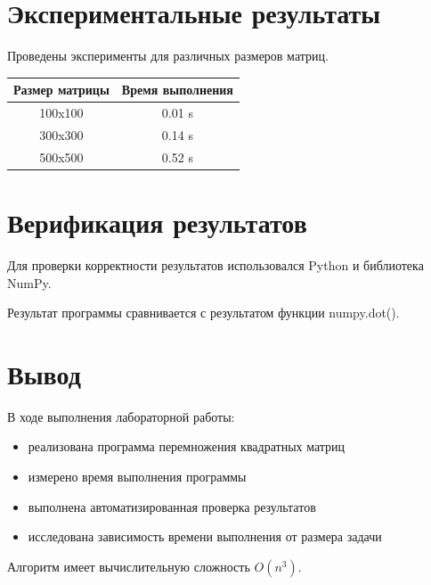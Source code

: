 \documentclass[a4paper,12pt]{article}
\begin{document}
\section{Экспериментальные результаты}

Проведены эксперименты для различных размеров матриц.

\begin{center}
\begin{tabular}{|c|c|}
\hline
Размер матрицы & Время выполнения \\
\hline
100x100 & 0.01 s \\
300x300 & 0.14 s \\
500x500 & 0.52 s \\
\hline
\end{tabular}
\end{center}

\section{Верификация результатов}

Для проверки корректности результатов использовался Python и библиотека NumPy.

Результат программы сравнивается с результатом функции numpy.dot().

\section{Вывод}

В ходе выполнения лабораторной работы:

\begin{itemize}
\item реализована программа перемножения квадратных матриц
\item измерено время выполнения программы
\item выполнена автоматизированная проверка результатов
\item исследована зависимость времени выполнения от размера задачи
\end{itemize}

Алгоритм имеет вычислительную сложность $O(n^3)$.
\end{document}
